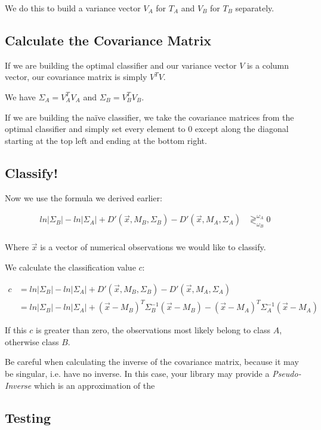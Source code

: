 \documentclass{article}
\begin{document}
We do this to build a variance vector $V_A$ for $T_A$ and $V_B$ for
$T_B$ separately.

\subsection{Calculate the Covariance Matrix}

If we are building the optimal classifier and our variance vector $V$
is a column vector, our covariance matrix is simply $V^TV$.

We have $\Sigma_A = V_A^TV_A$ and $\Sigma_B = V_B^TV_B$.

If we are building the na\"ive classifier, we take the covariance
matrices from the optimal classifier and simply set every element to
$0$ except along the diagonal starting at the top left and ending at
the bottom right.

\subsection{Classify!}

Now we use the formula we derived earlier:

\begin{align*}
  ln|\Sigma_B| - ln|\Sigma_A| +
  D'(\vec{x},M_B,\Sigma_B) - D'(\vec{x},M_A,\Sigma_A)
  &\gtrless^{\omega_A}_{\omega_B}
  0 \\
\end{align*}

Where $\vec{x}$ is a vector of numerical observations we would like to
classify.

We calculate the classification value $c$:

\begin{align*}
  c 
  &=
  ln|\Sigma_B| - ln|\Sigma_A| +
  D'(\vec{x},M_B,\Sigma_B) - D'(\vec{x},M_A,\Sigma_A) \\
  &=
  ln|\Sigma_B| - ln|\Sigma_A| +
  (\vec{x}-M_B)^T \Sigma_B^{-1} (\vec{x}-M_B) - 
  (\vec{x}-M_A)^T \Sigma_A^{-1} (\vec{x}-M_A)
\end{align*}

If this $c$ is greater than zero, the observations most likely belong
to class $A$, otherwise class $B$.

Be careful when calculating the inverse of the covariance matrix,
because it may be singular, i.e. have no inverse.  In this case, your
library may provide a \emph{Pseudo-Inverse}\cite{wiki_pinv} which is
an approximation of the

\subsection{Testing}
\end{document}
